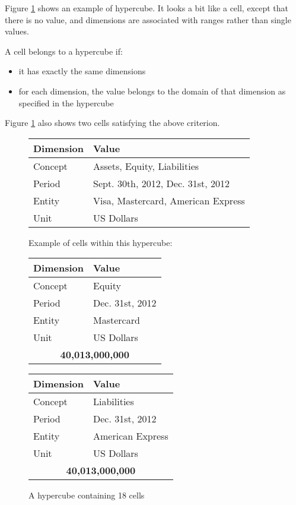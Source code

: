 \documentclass{vldb}
\begin{document}
Figure \ref{fig-hypercube} shows an example of hypercube. It looks a bit like a cell, except that there is no value, and dimensions are associated with ranges rather than single values.

A cell belongs to a hypercube if:

\begin{itemize}
\item it has exactly the same dimensions
\item for each dimension, the value belongs to the domain of that dimension as specified in the hypercube
\end{itemize}

Figure \ref{fig-hypercube} also shows two cells satisfying the above criterion.

\begin{figure}
\caption{A hypercube containing 18 cells}
\label{fig-hypercube}
\begin{tabular}{|l|l|}
\hline
Dimension & Value \\
\hline
Concept & Assets, Equity, Liabilities \\
Period & Sept. 30th, 2012, Dec. 31st, 2012 \\
Entity & Visa, Mastercard, American Express \\
Unit & US Dollars \\
\hline
\end{tabular}

Example of cells within this hypercube:

\begin{tabular}{|l|l|}
\hline
Dimension & Value \\
\hline
Concept & Equity \\
Period & Dec. 31st, 2012 \\
Entity & Mastercard \\
Unit & US Dollars \\
\hline
\multicolumn{2}{|c|}{\textbf{40,013,000,000}} \\
\hline
\end{tabular}
\begin{tabular}{|l|l|}
\hline
Dimension & Value \\
\hline
Concept & Liabilities \\
Period & Dec. 31st, 2012 \\
Entity & American Express \\
Unit & US Dollars \\
\hline
\multicolumn{2}{|c|}{\textbf{40,013,000,000}} \\
\hline
\end{tabular}
\end{figure}
\end{document}
